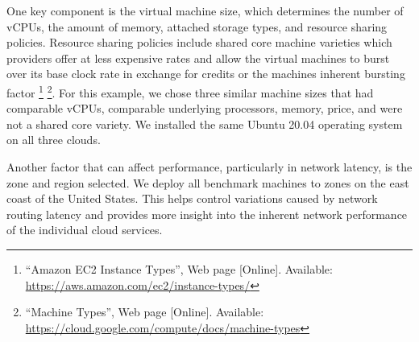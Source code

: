 One key component is the virtual machine size, which determines the
number of vCPUs, the amount of memory, attached storage types, and
resource sharing policies. Resource sharing policies include shared core
machine varieties which providers offer at less expensive rates and
allow the virtual machines to burst over its base clock rate in exchange
for credits or the machines inherent bursting factor \footnote{``Amazon
  EC2 Instance Types'', Web page {[}Online{]}. Available:
  \url{https://aws.amazon.com/ec2/instance-types/}} \footnote{``Machine
  Types'', Web page {[}Online{]}. Available:
  \url{https://cloud.google.com/compute/docs/machine-types}}. For this
example, we chose three similar machine sizes that had comparable vCPUs,
comparable underlying processors, memory, price, and were not a shared
core variety. We installed the same Ubuntu 20.04 operating system on all
three clouds.

Another factor that can affect performance, particularly in network
latency, is the zone and region selected. We deploy all benchmark
machines to zones on the east coast of the United States. This helps
control variations caused by network routing latency and provides more
insight into the inherent network performance of the individual cloud
services.


